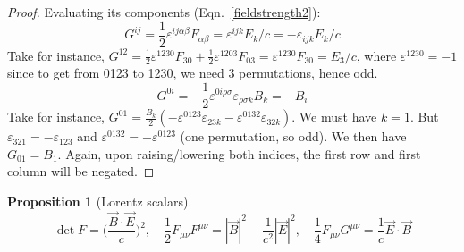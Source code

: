 \documentclass[a4paper]{article}
\theoremstyle{new}
\newtheorem{prop}{Proposition}[section]
\begin{document}
\begin{proof}
Evaluating its components (Eqn.~\ref{fieldstrength2}):
$$G^{ij}=\frac{1}{2}\varepsilon^{ij\alpha\beta}F_{\alpha\beta}=\varepsilon^{ijk}E_k/c=-\varepsilon_{ijk}E_k/c$$
Take for instance, $G^{12}=\frac{1}{2}\varepsilon^{1230}F_{30}+\frac{1}{2}\varepsilon^{1203}F_{03}=\varepsilon^{1230}F_{30}=E_3/c$, where $\varepsilon^{1230}=-1$ since to get from 0123 to 1230, we need 3 permutations, hence odd.
$$G^{0i}=-\frac{1}{2}\varepsilon^{0i\rho\sigma}\varepsilon_{\rho\sigma k}B_k=-B_i$$
Take for instance, $G^{01}=\frac{B_k}{2}(-\varepsilon^{0123}\varepsilon_{23k}-\varepsilon^{0132}\varepsilon_{32k})$. We must have $k=1$. But $\varepsilon_{321}=-\varepsilon_{123}$ and $\varepsilon^{0132}=-\varepsilon^{0123}$ (one permutation, so odd). We then have $G_{01}=B_1$. Again, upon raising/lowering both indices, the first row and first column will be negated.
\end{proof}
\begin{prop}[Lorentz scalars]
\begin{equation}
\det F=\bigg(\frac{\vec{B}\cdot\vec{E}}{c}\bigg)^2,\quad\frac{1}{2}F_{\mu\nu}F^{\mu\nu}=|\vec{B}|^2-\frac{1}{c^2}|\vec{E}|^2,\quad\frac{1}{4}F_{\mu\nu}G^{\mu\nu}=\frac{1}{c}\vec{E}\cdot\vec{B}\label{scalars}
\end{equation}
\end{prop}
\end{document}

